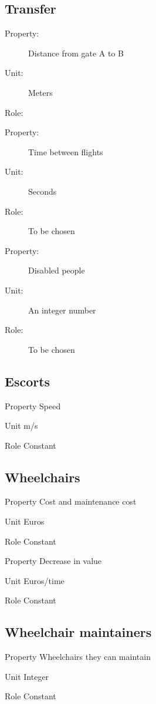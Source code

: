 \documentclass[a4paper, 12pt, notitlepage]{report}
\begin{document}
\subsection{Transfer} 
\begin{description}
\item[Property:] Distance from gate A to B
\item[Unit:] Meters
\item[Role:] 
\end{description}
\begin{description}
\item[Property:] Time between flights
\item[Unit:] Seconds
\item[Role:] To be chosen
\end{description}
\begin{description}
\item[Property:] Disabled people
\item[Unit:] An integer number
\item[Role:] To be chosen
\end{description}
\subsection{Escorts}
\begin{Description}
\item[Property]Speed
\item[Unit]m/s
\item[Role]Constant
\end{Description}
\subsection{Wheelchairs}
\begin{Description}
\item[Property]Cost and maintenance cost
\item[Unit]Euros
\item[Role]Constant

\item[Property]Decrease in value
\item[Unit]Euros/time
\item[Role]Constant
\end{Description}
\subsection{Wheelchair maintainers}
\begin{Description}
\item[Property]Wheelchairs they can maintain
\item[Unit]Integer
\item[Role]Constant
\end{Description}
\end{document}
